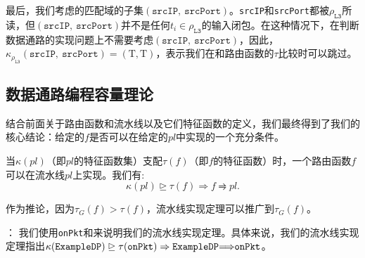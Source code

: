
最后，我们考虑\exampledp{}的匹配域的子集$(\texttt{srcIP},\ \texttt{srcPort})$。\texttt{srcIP}和\texttt{srcPort}都被$\rho_{\texttt{L3}}$所读，但$(\texttt{srcIP},\ \texttt{srcPort})$并不是任何$t_i \in \rho_{\texttt{L3}}$的输入闭包。在这种情况下，在判断数据通路的实现问题上不需要考虑$(\texttt{srcIP},\ \texttt{srcPort})$，因此，$\kappa_{\rho_{\texttt{L3}}}(\texttt{srcIP},\ \texttt{srcPort}) = (\mathrm{T}, \mathrm{T})$，表示我们在和路由函数的$\tau$比较时可以跳过。



\subsection{数据通路编程容量理论}
结合前面关于路由函数和流水线以及它们特征函数的定义，我们最终得到了我们的核心结论：给定的$f$是否可以在给定的$pl$中实现的一个充分条件。

\begin{theorem}[流水线实现定理] 当$\kappa(pl)$（即$pl$的特征函数集）支配$\tau(f)$（即$f$的特征函数）时，一个路由函数$f$可以在流水线$pl$上实现。我们有:
\begin{equation*}
\kappa(pl) \trianglerighteq \tau(f) \Rightarrow f \rightrightharpoons pl.
\end{equation*}
\end{theorem}

作为推论，因为$\tau_G(f) > \tau(f)$，流水线实现定理可以推广到$\tau_G(f)$。

： 我们使用\texttt{onPkt}和\exampledp 来说明我们的流水线实现定理。具体来说，我们的流水线实现定理指出$\kappa(\texttt{ExampleDP}) \trianglerighteq \tau(\texttt{onPkt}) \Rightarrow \texttt{ExampleDP} {\Longrightarrow} \texttt{onPkt}$。


